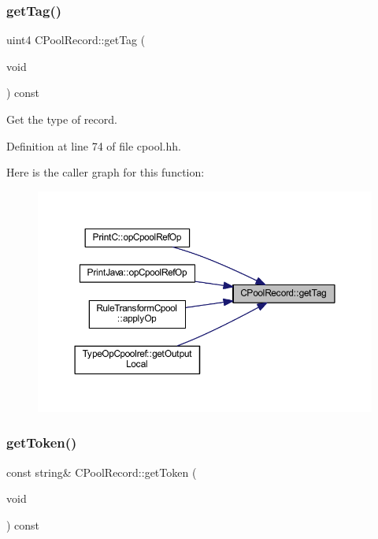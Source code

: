 \subsubsection{\texorpdfstring{getTag()}{getTag()}}
{\footnotesize\ttfamily uint4 C\+Pool\+Record\+::get\+Tag (\begin{DoxyParamCaption}\item[{void}]{ }\end{DoxyParamCaption}) const\hspace{0.3cm}{\ttfamily [inline]}}



Get the type of record. 



Definition at line 74 of file cpool.\+hh.

Here is the caller graph for this function\+:
\nopagebreak
\begin{figure}[H]
\begin{center}
\leavevmode
\includegraphics[width=350pt]{class_c_pool_record_ad446b1f55deb567ad7e9671512dc1c94_icgraph}
\end{center}
\end{figure}
\mbox{\label{class_c_pool_record_a7b76b5b4547e4cedc60b79e635fda432}} 
\subsubsection{\texorpdfstring{getToken()}{getToken()}}
{\footnotesize\ttfamily const string\& C\+Pool\+Record\+::get\+Token (\begin{DoxyParamCaption}\item[{void}]{ }\end{DoxyParamCaption}) const\hspace{0.3cm}{\ttfamily [inline]}}



